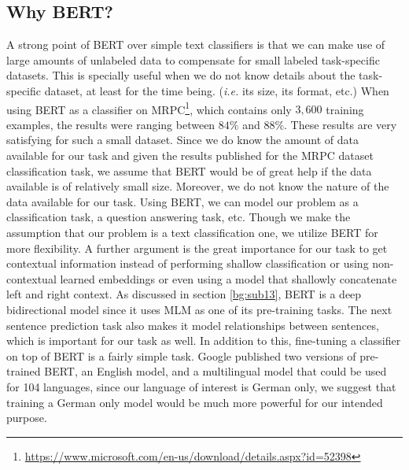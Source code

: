 \subsection{Why BERT?}

 A strong point of \ac{BERT} over simple text classifiers is that we can make use of large amounts of unlabeled data to compensate for small labeled task-specific datasets. This is specially useful when we do not know details about the task-specific dataset, at least for the time being. (\textit{i.e.} its size, its format, etc.) When using \ac{BERT} as a classifier on \ac{MRPC}\footnote{\url{https://www.microsoft.com/en-us/download/details.aspx?id=52398}}, which contains only $3,600$ training examples, the results were ranging between $84\%$ and $88\%$. These results are very satisfying for such a small dataset. Since we do know the amount of data available for our task and given the results published for the \ac{MRPC} dataset classification task, we assume that \ac{BERT} would be of great help if the data available is of relatively small size. Moreover, we do not know the nature of the data available for our task. Using \ac{BERT}, we can model our problem as a classification task, a question answering task, etc. Though we make the assumption that our problem is a text classification one, we utilize \ac{BERT} for more flexibility. A further argument is the great importance for our task to get contextual information instead of performing shallow classification or using non-contextual learned embeddings or even using a model that shallowly concatenate left and right context. As discussed in section \ref{bg:sub13}, \ac{BERT} is a deep bidirectional model since it uses \acf{MLM} as one of its pre-training tasks. The next sentence prediction task also makes it model relationships between sentences, which is important for our task as well. In addition to this, fine-tuning a classifier on top of \ac{BERT} is a fairly simple task. Google published two versions of pre-trained \ac{BERT}, an English model, and a multilingual model that could be used for 104 languages, since our language of interest is German only, we suggest that training a German only model would be much more powerful for our intended purpose.

